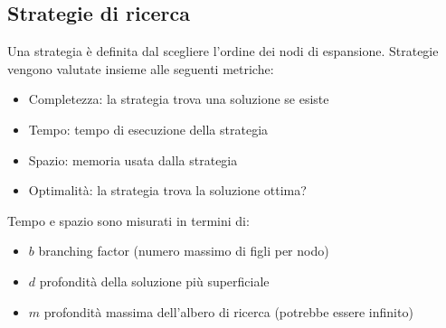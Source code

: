 \documentclass[a4paper]{article}
\begin{document}
\subsection{Strategie di ricerca}

Una strategia è definita dal scegliere l'ordine dei nodi di espansione.
Strategie vengono valutate insieme alle seguenti metriche:
\begin{itemize}
    \item Completezza: la strategia trova una soluzione se esiste
    \item Tempo: tempo di esecuzione della strategia
    \item Spazio: memoria usata dalla strategia
    \item Optimalità: la strategia trova la soluzione ottima?
\end{itemize}
Tempo e spazio sono misurati in termini di:
\begin{itemize}
    \item $b$ branching factor (numero massimo di figli per nodo)
    \item $d$ profondità della soluzione più superficiale
    \item $m$ profondità massima dell'albero di ricerca (potrebbe essere infinito)
\end{itemize}
\end{document}
